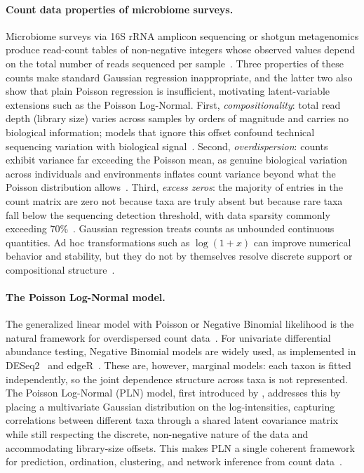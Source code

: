 \documentclass[useAMS,usenatbib,referee]{biom}
\begin{document}
\paragraph{Count data properties of microbiome surveys.}
Microbiome surveys via 16S rRNA amplicon sequencing or shotgun metagenomics produce read-count tables of non-negative integers whose observed values depend on the total number of reads sequenced per sample~\citep{HMP2012, Thompson2017, Xia2023}.
Three properties of these counts make standard Gaussian regression inappropriate, and the latter two also show that plain Poisson regression is insufficient, motivating latent-variable extensions such as the Poisson Log-Normal.
First, \emph{compositionality}: total read depth (library size) varies across samples by orders of magnitude and carries no biological information; models that ignore this offset confound technical sequencing variation with biological signal~\citep{mcmurdie2014waste}.
Second, \emph{overdispersion}: counts exhibit variance far exceeding the Poisson mean, as genuine biological variation across individuals and environments inflates count variance beyond what the Poisson distribution allows~\citep{zhang2017nbmm}.
Third, \emph{excess zeros}: the majority of entries in the count matrix are zero not because taxa are truly absent but because rare taxa fall below the sequencing detection threshold, with data sparsity commonly exceeding 70\%~\citep{Batardiere2025ZIPLN, Kodikara2022}.
Gaussian regression treats counts as unbounded continuous quantities.
Ad hoc transformations such as $\log(1+x)$ can improve numerical behavior and stability, but they do not by themselves resolve discrete support or compositional structure~\citep{booeshaghi2021log1p}.

\paragraph{The Poisson Log-Normal model.}
The generalized linear model with Poisson or Negative Binomial likelihood is the natural framework for overdispersed count data~\citep{zhang2017nbmm}.
For univariate differential abundance testing, Negative Binomial models are widely used, as implemented in DESeq2~\citep{Love2014DESeq2} and edgeR~\citep{Robinson2010edgeR}.
These are, however, marginal models: each taxon is fitted independently, so the joint dependence structure across taxa is not represented.
The Poisson Log-Normal (PLN) model, first introduced by \citet{aitchison1989multivariate}, addresses this by placing a multivariate Gaussian distribution on the log-intensities, capturing correlations between different taxa through a shared latent covariance matrix while still respecting the discrete, non-negative nature of the data and accommodating library-size offsets.
This makes PLN a single coherent framework for prediction, ordination, clustering, and network inference from count data~\citep{Chiquet2021, Subedi2025}.
\end{document}
